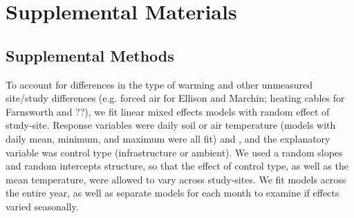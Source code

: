 \documentclass{article}
\begin{document}
\section*{Supplemental Materials}

\subsection*{Supplemental Methods}

To account for differences in the type of warming and other unmeasured site/study differences (e.g. forced air for Ellison and Marchin; heating cables for Farnsworth and ??), we fit linear mixed effects models with random effect of study-site. Response variables were daily soil or air temperature (models with daily  mean, minimum, and maximum were all fit) and , and the explanatory variable was control type (infrastructure or ambient). We used a random slopes and random intercepts structure, so that the effect of control type, as well as the mean temperature, were allowed to vary across study-sites. We fit models across the entire year, as well as separate models for each month to examine if effects varied seasonally.
\end{document}
